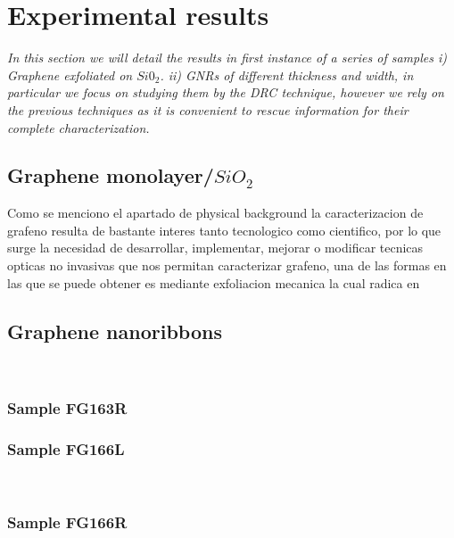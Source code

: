 \chapter{Experimental results}
\label{chap:chap3}
\textit{In this section we will detail the results in first instance of a series of samples i) Graphene exfoliated on $Si0_2$. ii) GNRs of different thickness and width, in particular we focus on studying them by the DRC technique, however we rely on the previous techniques as it is convenient to rescue information for their complete characterization. }
\vfill
\minitoc
\newpage

\allowdisplaybreaks
\section{Graphene monolayer/$SiO_2$}
\vspace{-1cm}
Como se menciono el apartado de physical background la caracterizacion de grafeno resulta de bastante interes tanto tecnologico como cientifico, por lo que surge la necesidad de desarrollar, implementar, mejorar o modificar tecnicas opticas no invasivas que nos permitan caracterizar grafeno, una de las formas en las que se puede obtener es mediante exfoliacion mecanica la cual radica en 


\section{Graphene nanoribbons}
\

\subsection{Sample FG163R}

\subsection{Sample FG166L}
\
\subsection{Sample FG166R}


  

